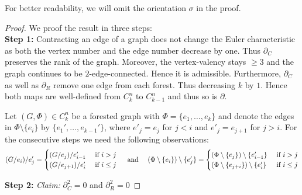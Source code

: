 For better readability, we will omit the orientation $\sigma$ in the proof.
\begin{proof}


	We proof the result in three steps:\\
	\textbf{Step 1:} Contracting an edge of a graph does not change the Euler characteristic as both the vertex number and the edge number decrease by one.
	Thus $\partial_{C}$ preserves the rank of the graph. Moreover, the vertex-valency stays $\geq 3$ and the graph continues to be $2$-edge-connected.
	Hence it is admissible.
	Furthermore, $\partial_{C}$ as well as $\partial_{R}$ remove one edge from each forest. Thus decreasing
	$k$ by $1$. Hence both maps are well-defined from $C^{n}_{k}$ to $C^{n}_{k-1}$ and thus so is $\partial$.

	Let $(G,\Phi) \in C^{n}_{k}$ be a forested graph with $\Phi = \{e_1,\ldots,e_{k}\}$  and denote the edges in $\Phi \setminus \{e_{i}\}$ by $\{e_1',\ldots,e_{k-1}'\}$,
	where $e'_{j} = e_{j}$ for $j < i$ and $e'_{j} = e_{j+1}$ for $j > i$.
	For the consecutive steps we need the following observations:
	\[
		(G / e_{i}) /  e_{j}' = \begin{cases}
			(G / e_{j}) / e_{i-1}' & \text{ if } i > j\\
			(G / e_{j+1}) / e_{i}' & \text{ if } i \leq j
		\end{cases}
		\qq{ and }
		(\Phi \setminus \{e_{i}\}) \setminus \{e_{j}'\}  = \begin{cases}	
			(\Phi \setminus \{e_{j}\}) \setminus \{e_{i-1}'\} & \text{ if } i > j\\
			(\Phi \setminus \{e_{j+i}\}) \setminus \{e_{i}'\} & \text{ if } i \leq j
		\end{cases}
	\]

	\textbf{Step 2:} \emph{Claim:} $\partial_{C}^2 = 0$ and $\partial_{R}^2 = 0$


\end{proof}
